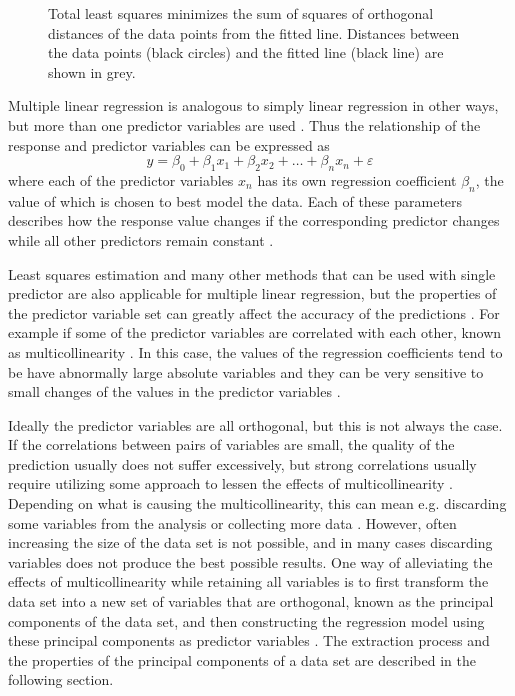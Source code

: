 \documentclass[english, oneside]{HYgradu}
\begin{document}
\begin{figure}
    \centering
    
    \caption{Total least squares minimizes the sum of squares of orthogonal distances of the data points from the fitted line. Distances between the data points (black circles) and the fitted line (black line) are shown in grey.}\label{fig:TLS}
\end{figure}

Multiple linear regression is analogous to simply linear regression in other ways, but more than one predictor variables are used \citep{xin2009linear}. Thus the relationship of the response and predictor variables can be expressed as
\begin{equation}
	y = \beta_0 + \beta_1 x_1 + \beta_2 x_2 + \dots + \beta_n x_n + \varepsilon
\end{equation}
where each of the predictor variables $x_n$ has its own regression coefficient $\beta_n$, the value of which is chosen to best model the data. Each of these parameters describes how the response value changes if the corresponding predictor changes while all other predictors remain constant \citep{montgomery2012introduction}.

Least squares estimation and many other methods that can be used with single predictor are also applicable for multiple linear regression, but the properties of the predictor variable set can greatly affect the accuracy of the predictions \citep{montgomery2012introduction}. For example if some of the predictor variables are correlated with each other, known as multicollinearity \citep{montgomery2012introduction}. In this case, the values of the regression coefficients tend to be have abnormally large absolute variables and they can be very sensitive to small changes of the values in the predictor variables \citep{montgomery2012introduction}.

Ideally the predictor variables are all orthogonal, but this is not always the case. If the correlations between pairs of variables are small, the quality of the prediction usually does not suffer excessively, but strong correlations usually require utilizing some approach to lessen the effects of multicollinearity \citep{montgomery2012introduction}. Depending on what is causing the multicollinearity, this can mean e.g. discarding some variables from the analysis or collecting more data \citep{montgomery2012introduction}. However, often increasing the size of the data set is not possible, and in many cases discarding variables does not produce the best possible results. One way of alleviating the effects of multicollinearity while retaining all variables is to first transform the data set into a new set of variables that are orthogonal, known as the principal components of the data set, and then constructing the regression model using these principal components as predictor variables \citep{montgomery2012introduction}. The extraction process and the properties of the principal components of a data set are described in the following section.
\end{document}
